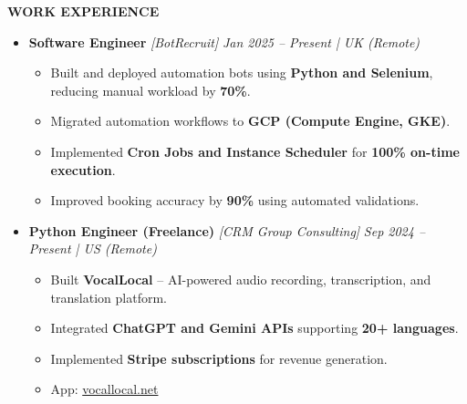 \documentclass[a4paper,10pt]{article}
\newcommand{\resheading}[1]{{\small \colorbox{mygrey}{\begin{minipage}{0.975\textwidth}{\textbf{#1}}\end{minipage}}}}
\begin{document}
\vspace{3mm}

\resheading{\textbf{WORK EXPERIENCE}}

\begin{itemize}

\item {\bf Software Engineer} \textit{[BotRecruit]}
\textit{\hfill {Jan 2025 -- Present | UK (Remote)}}

\begin{itemize}
\item Built and deployed automation bots using \textbf{Python and Selenium},
reducing manual workload by \textbf{70\%}.
\item Migrated automation workflows to \textbf{GCP (Compute Engine, GKE)}.
\item Implemented \textbf{Cron Jobs and Instance Scheduler}
for \textbf{100\% on-time execution}.
\item Improved booking accuracy by \textbf{90\%} using automated validations.
\end{itemize}

\end{itemize}

\begin{itemize}

\item {\bf Python Engineer (Freelance)} \textit{[CRM Group Consulting]}
\textit{\hfill {Sep 2024 -- Present | US (Remote)}}

\begin{itemize}
\item Built \textbf{VocalLocal} -- AI-powered audio recording, transcription, and translation platform.
\item Integrated \textbf{ChatGPT and Gemini APIs} supporting \textbf{20+ languages}.
\item Implemented \textbf{Stripe subscriptions} for revenue generation.
\item App: \href{https://vocallocal.net/}{vocallocal.net}
\end{itemize}

\end{itemize}
\end{document}
